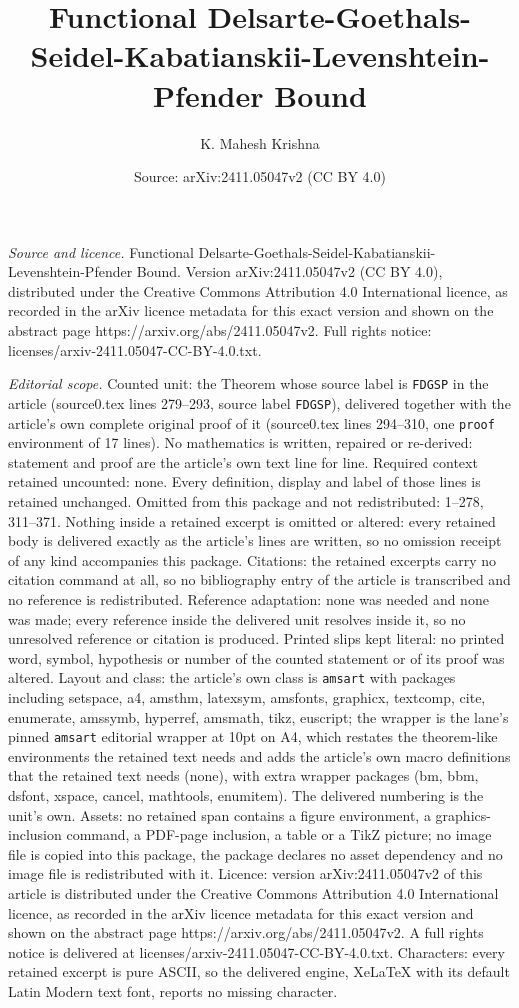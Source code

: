 \documentclass[10pt,a4paper]{amsart}
\title[Functional Delsarte-Goethals-Seidel-Kabatianskii-Levenshtein]{Functional Delsarte-Goethals-Seidel-Kabatianskii-Levenshtein-Pfender Bound}
\author{K. Mahesh Krishna}
\date{Source: arXiv:2411.05047v2 (CC BY 4.0)}
\begin{document}
\maketitle

\noindent\emph{Source and licence.} Functional Delsarte-Goethals-Seidel-Kabatianskii-Levenshtein-Pfender Bound. Version arXiv:2411.05047v2 (CC BY 4.0), distributed under the Creative Commons Attribution 4.0 International licence, as recorded in the arXiv licence metadata for this exact version and shown on the abstract page https://arxiv.org/abs/2411.05047v2. Full rights notice: licenses/arxiv-2411.05047-CC-BY-4.0.txt.\par\smallskip

\noindent\textit{Editorial scope.} Counted unit: the Theorem whose source label is \texttt{FDGSP} in the article (source0.tex lines 279--293, source label \texttt{FDGSP}), delivered together with the article's own complete original proof of it (source0.tex lines 294--310, one \texttt{proof} environment of 17 lines). No mathematics is written, repaired or re-derived: statement and proof are the article's own text line for line. Required context retained uncounted: none. Every definition, display and label of those lines is retained unchanged. Omitted from this package and not redistributed: 1--278, 311--371. Nothing inside a retained excerpt is omitted or altered: every retained body is delivered exactly as the article's lines are written, so no omission receipt of any kind accompanies this package. Citations: the retained excerpts carry no citation command at all, so no bibliography entry of the article is transcribed and no reference is redistributed. Reference adaptation: none was needed and none was made; every reference inside the delivered unit resolves inside it, so no unresolved reference or citation is produced. Printed slips kept literal: no printed word, symbol, hypothesis or number of the counted statement or of its proof was altered. Layout and class: the article's own class is \texttt{amsart} with packages including setspace, a4, amsthm, latexsym, amsfonts, graphicx, textcomp, cite, enumerate, amssymb, hyperref, amsmath, tikz, euscript; the wrapper is the lane's pinned \texttt{amsart} editorial wrapper at 10pt on A4, which restates the theorem-like environments the retained text needs and adds the article's own macro definitions that the retained text needs (none), with extra wrapper packages (bm, bbm, dsfont, xspace, cancel, mathtools, enumitem). The delivered numbering is the unit's own. Assets: no retained span contains a figure environment, a graphics-inclusion command, a PDF-page inclusion, a table or a TikZ picture; no image file is copied into this package, the package declares no asset dependency and no image file is redistributed with it. Licence: version arXiv:2411.05047v2 of this article is distributed under the Creative Commons Attribution 4.0 International licence, as recorded in the arXiv licence metadata for this exact version and shown on the abstract page https://arxiv.org/abs/2411.05047v2. A full rights notice is delivered at licenses/arxiv-2411.05047-CC-BY-4.0.txt. Characters: every retained excerpt is pure ASCII, so the delivered engine, XeLaTeX with its default Latin Modern text font, reports no missing character.
\end{document}

